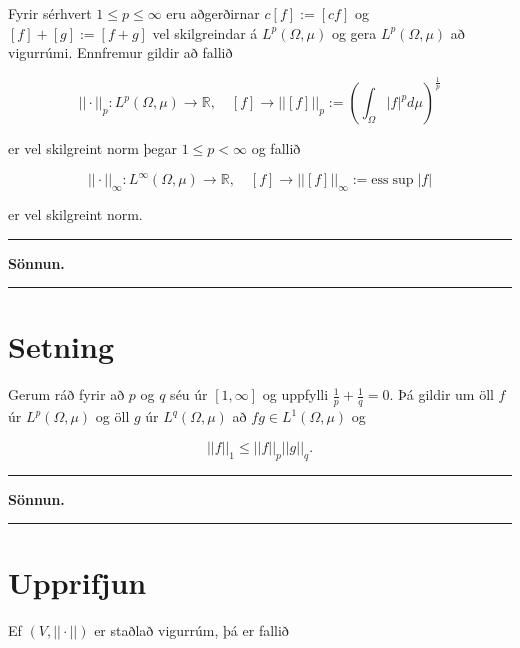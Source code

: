 \documentclass[]{book}
\begin{document}
Fyrir sérhvert \(1\leq p \leq \infty\) eru aðgerðirnar \(c[f] := [cf]\) og \([f] + [g] := [f + g]\) vel skilgreindar á \(L^p(\Omega,\mu)\) og gera \(L^p(\Omega,\mu)\) að vigurrúmi. Ennfremur gildir að fallið

\[
||\cdot||_p: L^p(\Omega,\mu) \rightarrow \mathbb R, \quad [f]\rightarrow||[f]||_p:= \left(\int_\Omega|f|^pd\mu\right)^{\frac1p}
\]

er vel skilgreint norm þegar \(1\leq p < \infty\) og fallið

\[
||\cdot||_\infty : L^\infty(\Omega,\mu) \rightarrow \mathbb R, \quad [f]\rightarrow ||[f]||_\infty:=\text{ess}\sup|f|
\]

er vel skilgreint norm.

\begin{center}\rule{0.5\linewidth}{\linethickness}\end{center}

\textbf{Sönnun.}

\begin{center}\rule{0.5\linewidth}{\linethickness}\end{center}

\hypertarget{setning-69}{%
\section*{Setning}\label{setning-69}}

Gerum ráð fyrir að \(p\) og \(q\) séu úr \([1,\infty]\) og uppfylli \(\frac1p + \frac1q = 0\). Þá gildir um öll \(f\) úr \(L^p(\Omega,\mu)\) og öll \(g\) úr \(L^q(\Omega,\mu)\) að \(fg\in L^1(\Omega,\mu)\) og

\[
||f||_1 \leq ||f||_p||g||_q.
\]

\begin{center}\rule{0.5\linewidth}{\linethickness}\end{center}

\textbf{Sönnun.}

\begin{center}\rule{0.5\linewidth}{\linethickness}\end{center}

\hypertarget{upprifjun-2}{%
\section*{Upprifjun}\label{upprifjun-2}}

Ef \((V, ||\cdot||)\) er staðlað vigurrúm, þá er fallið
\end{document}
